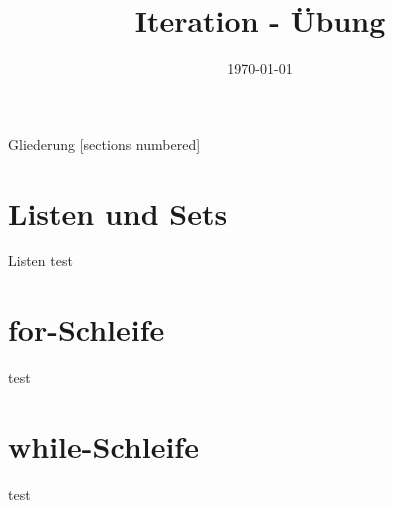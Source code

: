 



\title{Iteration - Übung}
\date{\today}


\maketitle

\begin{frame}{Gliederung}
	[sections numbered]
	\tableofcontents
\end{frame}


\section{Listen und Sets}
\begin{frame}{Listen}
	test
\end{frame}

\section{for-Schleife}
\begin{frame}
	test
\end{frame}

\section{while-Schleife}
\begin{frame}
	test
\end{frame}

